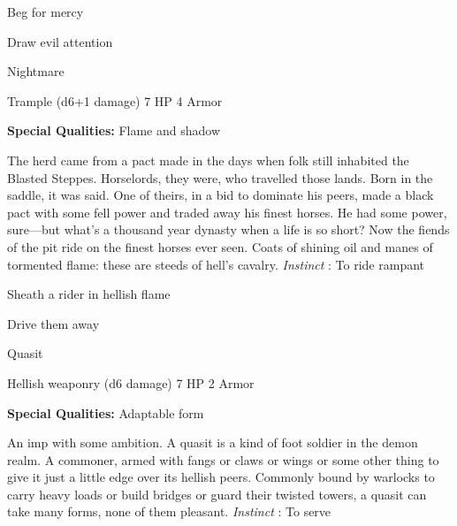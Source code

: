          
\item Beg for mercy

         
\item Draw evil attention

       
\stopitemize
       
\startMonsterName
Nightmare	 
\stopMonsterName
       

Trample (d6+1 damage)	7 HP	4 Armor

       


       
\startMonsterQualities
         {\bf Special Qualities:}  Flame and shadow
\stopMonsterQualities
       
\startMonsterDescription
The herd came from a pact made in the days when folk still inhabited the Blasted Steppes. Horselords, they were, who travelled those lands. Born in the saddle, it was said. One of theirs, in a bid to dominate his peers, made a black pact with some fell power and traded away his finest horses. He had some power, sure—but what’s a thousand year dynasty when a life is so short? Now the fiends of the pit ride on the finest horses ever seen. Coats of shining oil and manes of tormented flame: these are steeds of hell’s cavalry. {\em Instinct} : To ride rampant
\stopMonsterDescription
       
\startitemize[1,packed]
         
\item Sheath a rider in hellish flame

         
\item Drive them away

       
\stopitemize
       
\startMonsterName
Quasit	 
\stopMonsterName
       

Hellish weaponry (d6 damage)	7 HP	2 Armor

       


       
\startMonsterQualities
         {\bf Special Qualities:}  Adaptable form
\stopMonsterQualities
       
\startMonsterDescription
An imp with some ambition. A quasit is a kind of foot soldier in the demon realm. A commoner, armed with fangs or claws or wings or some other thing to give it just a little edge over its hellish peers. Commonly bound by warlocks to carry heavy loads or build bridges or guard their twisted towers, a quasit can take many forms, none of them pleasant. {\em Instinct} : To serve
\stopMonsterDescription
       
